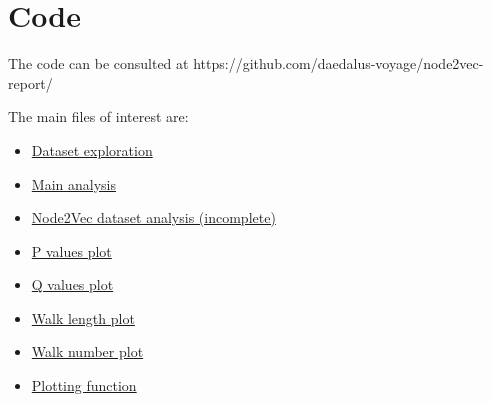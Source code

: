 \documentclass[a4paper,10pt]{article}
\begin{document}
\section{Code}

The code can be consulted at https://github.com/daedalus-voyage/node2vec-report/

The main files of interest are:

\begin{itemize}
\item \href{https://github.com/daedalus-voyage/node2vec-report/blob/main/cora_dataset.ipynb}{Dataset exploration}
\item \href{https://github.com/daedalus-voyage/node2vec-report/blob/main/cora_node2vec.ipynb}{Main analysis}
\item \href{https://github.com/daedalus-voyage/node2vec-report/blob/main/run_pq_variations_keras.ipynb}{Node2Vec dataset analysis (incomplete)}
\item \href{https://github.com/daedalus-voyage/node2vec-report/blob/main/pvals_plot.m}{P values plot}
\item \href{https://github.com/daedalus-voyage/node2vec-report/blob/main/qvals_plot.m}{Q values plot}
\item \href{https://github.com/daedalus-voyage/node2vec-report/blob/main/walk_length_plot.m}{Walk length plot}
\item \href{https://github.com/daedalus-voyage/node2vec-report/blob/main/walk_number_plot.m}{Walk number plot}
\item \href{https://github.com/daedalus-voyage/node2vec-report/blob/main/plot_performance.m}{Plotting function}
\end{itemize}


\end{document}
